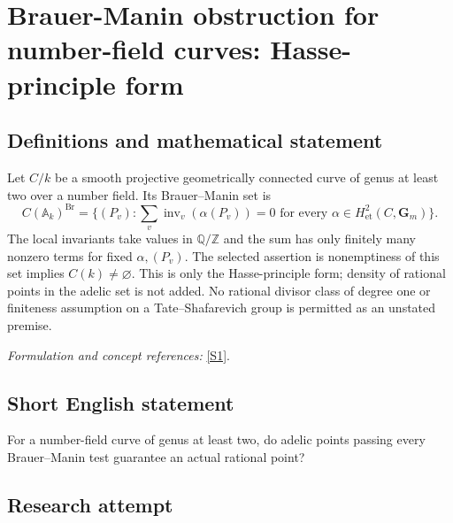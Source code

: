 \documentclass[11pt,a4paper]{article}
\newcommand{\Z}{\mathbb{Z}}
\newcommand{\Q}{\mathbb{Q}}
\newcommand{\A}{\mathbb{A}}
\newcommand{\sref}[2]{\hyperlink{source:#1:#2}{[S#2]}}
\newif\ifshowcatalogue
\newcommand{\cataloguescope}[1]{\ifshowcatalogue
 \paragraph{Exact scope in the supplied catalogue.}
 \begin{quote}\small #1\end{quote}\fi}
\begin{document}
\setcounter{section}{0}
\clearpage
\section*{\texorpdfstring{Brauer-Manin obstruction for number-field curves: Hasse-principle form}{Brauer-Manin obstruction for number-field curves: Hasse-principle form}}\label{statement}
\subsection{Definitions and mathematical statement}
Let $C/k$ be a smooth projective geometrically connected curve of genus at least two over a number field. Its Brauer--Manin set is
\[
 C(\A_k)^{\operatorname{Br}}=
 \{(P_v):\sum_v\operatorname{inv}_v(\alpha(P_v))=0
 \text{ for every }\alpha\in H^2_{\mathrm{et}}(C,\mathbf G_m)\}.
\]
The local invariants take values in $\Q/\Z$ and the sum has only finitely many nonzero terms for fixed $\alpha,(P_v)$. The selected assertion is nonemptiness of this set implies $C(k)\ne\varnothing$. This is only the Hasse-principle form; density of rational points in the adelic set is not added. No rational divisor class of degree one or finiteness assumption on a Tate--Shafarevich group is permitted as an unstated premise.
\par\smallskip\textit{Formulation and concept references:} \sref{statement}{1}.
\cataloguescope{For every number field k and every smooth projective geometrically connected curve C/k of genus at least two, if C(A\_k)\textasciicircum{}Br is nonempty then C(k) is nonempty. Here Br(C)=H\textasciicircum{}2\_et(C,G\_m) is the full cohomological Brauer group, and C(A\_k)\textasciicircum{}Br consists of adelic tuples (P\_v) for which sum\_v inv\_v(alpha(P\_v))=0 for every alpha in Br(C). Constants obey global reciprocity. Passing at archimedean places to connected components does not change nonemptiness. No rational base point, degree-one divisor class, Sha finiteness, rank bound or effective Jacobian presentation is assumed.}
\subsection{Short English statement}
For a number-field curve of genus at least two, do adelic points passing every Brauer–Manin test guarantee an actual rational point?
\subsection{Research attempt}
\end{document}
